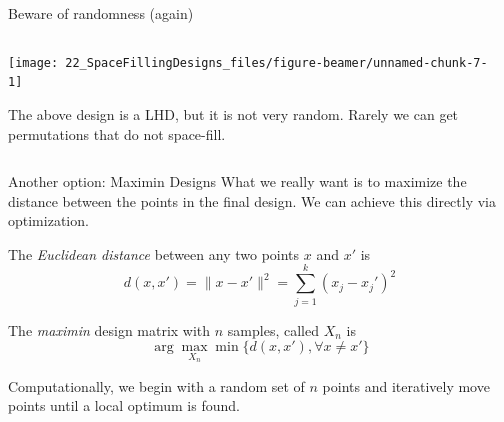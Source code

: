 \documentclass[
  9pt,
  ignorenonframetext,
]{beamer}
\begin{document}
\begin{frame}{Beware of randomness (again)}
\protect\hypertarget{beware-of-randomness-again}{}
\begin{columns}
\begin{column}{0.5\textwidth}


\begin{center}\texttt{[image: 22\_SpaceFillingDesigns\_files/figure-beamer/unnamed-chunk-7-1]} \end{center}
\bigskip
The above design is a LHD, but it is not very random. Rarely we can get permutations that do not space-fill.

\end{column}
\begin{column}{0.5\textwidth}
\end{column}
\end{columns}
\end{frame}

\begin{frame}{Another option: Maximin Designs}
\protect\hypertarget{another-option-maximin-designs}{}
What we really want is to maximize the distance between the points in
the final design. We can achieve this directly via optimization.

\pause

The \emph{Euclidean distance} between any two points \(x\) and \(x'\) is
\[ d(x,x') = \lVert x-x' \rVert^2 = \sum_{j=1}^k(x_j-x_j')^2 \]

\pause

The \emph{maximin} design matrix with \(n\) samples, called \(X_n\) is
\[ \arg \max_{X_n} \min\{ d(x,x'), \forall x\ne x' \} \]

\pause

Computationally, we begin with a random set of \(n\) points and
iteratively move points until a local optimum is found.
\end{frame}
\end{document}

